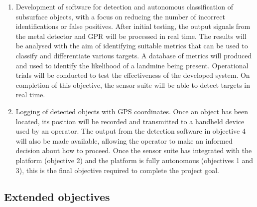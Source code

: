 \documentclass[main.tex]{subfiles}
\begin{document}
\begin{enumerate}
\item Development of software for detection and autonomous classification of subsurface objects, with a focus on reducing the number of incorrect identifications or false positives. After initial testing, the output signals from the metal detector and GPR will be processed in real time. The results will be analysed with the aim of identifying suitable metrics that can be used to classify and differentiate various targets. A database of metrics will produced and used to identify the likelihood of a landmine being present. Operational trials will be conducted to test the effectiveness of the developed system. On completion of this objective, the sensor suite will be able to detect targets in real time.

\item Logging of detected objects with GPS coordinates. Once an object has been located, its position will be recorded and transmitted to a handheld device used by an operator. The output from the detection software in objective 4 will also be made available, allowing the operator to make an informed decision about how to proceed. Once the sensor suite has integrated with the platform (objective 2) and the platform is fully autonomous (objectives 1 and 3), this is the final objective required to complete the project goal.
\end{enumerate}

\subsection{Extended objectives}
\end{document}
